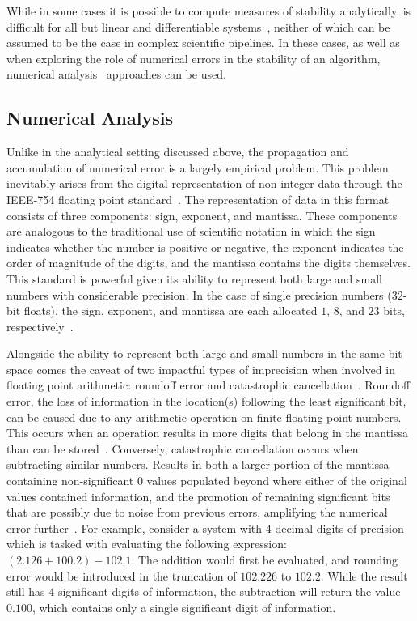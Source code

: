 While in some cases it is possible to compute measures of stability analytically, is difficult for all but linear and
differentiable systems~\cite{kiusalaas2013numerical}, neither of which can be assumed to be the case in complex
scientific pipelines. In these cases, as well as when exploring the role of numerical errors in the stability of an
algorithm, numerical analysis~\cite{hildebrand1987introduction} approaches can be used.

\subsection{Numerical Analysis}
Unlike in the analytical setting discussed above, the propagation and accumulation of numerical error is a largely
empirical problem. This problem inevitably arises from the digital representation of non-integer data through the
IEEE-754 floating point standard~\cite{ieee754}. The representation of data in this format consists of three
components: sign, exponent, and mantissa. These components are analogous to the traditional use of scientific notation
in which the sign indicates whether the number is positive or negative, the exponent indicates the order of magnitude
of the digits, and the mantissa contains the digits themselves. This standard is powerful given its ability to
represent both large and small numbers with considerable precision. In the case of single precision numbers ($32$-bit
floats), the sign, exponent, and mantissa are each allocated $1$, $8$, and $23$ bits, respectively~\cite{ieee754}.

Alongside the ability to represent both large and small numbers in the same bit space comes the caveat of two impactful
types of imprecision when involved in floating point arithmetic: roundoff error and catastrophic
cancellation~\cite{muller2018handbook}. Roundoff error, the loss of information in the location(s) following the least
significant bit, can be caused due to any arithmetic operation on finite floating point numbers. This occurs when an
operation results in more digits that belong in the mantissa than can be stored~\cite{muller2018handbook}. Conversely,
catastrophic cancellation occurs when subtracting similar numbers. Results in both a larger portion of the mantissa
containing non-significant $0$ values populated beyond where either of the original values contained information, and
the promotion of remaining significant bits that are possibly due to noise from previous errors, amplifying the
numerical error further~\cite{muller2018handbook}. For example, consider a system with $4$ decimal digits of precision
which is tasked with evaluating the following expression: $(2.126 + 100.2) - 102.1$. The addition would first be
evaluated, and rounding error would be introduced in the truncation of $102.226$ to $102.2$. While the result still
has $4$ significant digits of information, the subtraction will return the value $0.100$, which contains only a single
significant digit of information.

